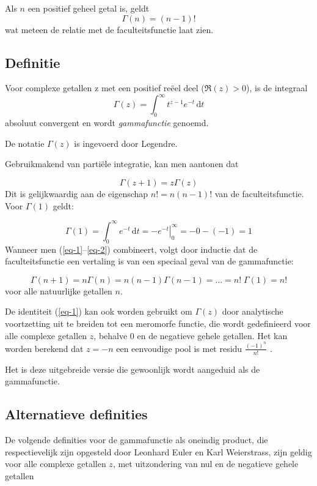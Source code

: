 \documentclass[11pt,a4paper]{amsart}
\begin{document}
Als \(n\) een positief geheel getal is, geldt
\[  \Gamma(n) = (n-1)!  \]
wat meteen de relatie met de faculteitsfunctie laat zien.

\subsection{Definitie}
Voor complexe getallen z met een positief reëel deel (\(\Re(z) > 0\)), is de integraal
\[\Gamma(z) = \int_0^\infty  t^{z-1} e^{-t}\,\mathrm{d}t\]
absoluut convergent en wordt \emph{gammafunctie} genoemd.

De notatie \(\Gamma(z)\) is ingevoerd door Legendre.

Gebruikmakend van partiële integratie, kan men aantonen dat

\begin{equation}
\label{eq-1}
\Gamma(z+1)=z\Gamma(z)
\end{equation}
Dit is gelijkwaardig aan de eigenschap \(n! = n(n - 1)!\) van de faculteitsfunctie. Voor \(\Gamma(1)\) geldt:

\begin{equation}
\label{eq-2}
 \Gamma(1) = \int_0^\infty e^{-t}\, \mathrm{d}t = \left. -e^{-t} \right|_0^\infty = -0 - (-1) = 1
\end{equation}
Wanneer men (\ref{eq-1}--\ref{eq-2}) combineert, volgt door inductie dat de faculteitsfunctie een vertaling is van een speciaal geval van de gammafunctie:

\[ \Gamma(n+1) = n\Gamma(n) = n (n-1) \Gamma(n-1) = \dots = n!\; \Gamma(1) = n!\]
voor alle natuurlijke getallen \(n\).

De identiteit (\ref{eq-1}) kan ook worden gebruikt om \(\Gamma(z)\) door analytische voortzetting uit te breiden tot een meromorfe functie, die wordt gedefinieerd voor alle complexe getallen \(z\), behalve 0 en de negatieve gehele getallen. Het kan worden berekend dat \(z = -n\) een eenvoudige pool is met residu \(\frac{(-1)^n}{n!}\) \cite{Allan}.

Het is deze uitgebreide versie die gewoonlijk wordt aangeduid als de gammafunctie.

\subsection{Alternatieve definities}

De volgende definities voor de gammafunctie als oneindig product, die respectievelijk zijn opgesteld door Leonhard Euler en Karl Weierstrass, zijn geldig voor alle complexe getallen \(z\), met uitzondering van nul en de negatieve gehele getallen
\end{document}
